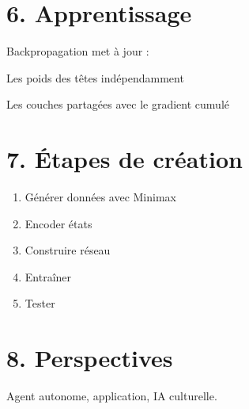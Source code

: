 \documentclass[12pt]{article}
\begin{document}
\section*{6. Apprentissage}
Backpropagation met à jour :
\item Les poids des têtes indépendamment
  \item Les couches partagées avec le gradient cumulé

\section*{7. Étapes de création}
\begin{enumerate}
  \item Générer données avec Minimax
  \item Encoder états
  \item Construire réseau
  \item Entraîner
  \item Tester
\end{enumerate}

\section*{8. Perspectives}
Agent autonome, application, IA culturelle.
\end{document}
